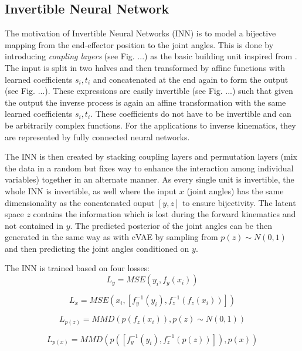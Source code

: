 \documentclass[conference]{IEEEtran}
\begin{document}
\subsection*{Invertible Neural Network}

The motivation of Invertible Neural Networks (INN) \cite{Ardizzone2018} is to model a bijective mapping from the end-effector position to the joint angles. This is done by introducing \textit{coupling layers} (see Fig. ...) as the basic building unit inspired from \cite{Dinh2016}.
The input is split in two halves and then transformed by affine functions with learned coefficients $s_i, t_i$ and concatenated at the end again to form the output (see Fig. ...). These expressions are easily invertible (see Fig. ...) such that given the output the inverse process is again an affine transformation with the same learned coefficients $s_i, t_i$. These coefficients do not have to be invertible and can be arbitrarily complex functions. For the applications to inverse kinematics, they are represented by fully connected neural networks.

The INN is then created by stacking coupling layers and permutation layers (mix the data in a random but fixes way to enhance the interaction among individual variables) together in an alternate manner. As every single unit is invertible, the whole INN is invertible, as well where the input $x$ (joint angles) has the same dimensionality as the concatenated ouput $[y, z]$ to ensure bijectivity. The latent space $z$ contains the information which is lost during the forward kinematics and not contained in $y$. The predicted posterior of the joint angles can be then generated in the same way as with cVAE by sampling from $p(z) \sim N(0, 1)$ and then predicting the joint angles conditioned on $y$.

The INN is trained based on four losses:
\begin{equation}
    L_y = MSE(y_i, f_y(x_i))
    \label{L_y}
\end{equation}

\begin{equation}
    L_x = MSE(x_i, [f_y^{-1}(y_i),f_z^{-1}(f_z(x_i))])
    \label{L_xy}
\end{equation}

\begin{equation}
    L_{p(z)} = MMD(p(f_z(x_i)), p(z)\sim N(0, 1))
    \label{L_z}
\end{equation}

\begin{equation}
    L_{p(x)} = MMD(p([f_y^{-1}(y_i), f_z^{-1}(p(z))]), p(x))
    \label{L_x}
\end{equation}
\end{document}
